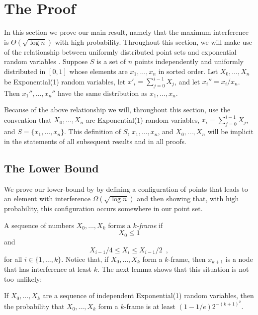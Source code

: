 \documentclass{patmorin}
\begin{document}
\section{The Proof}

In this section we prove our main result, namely that the maximum
interference is $\Theta(\sqrt{\log n})$ with high probability.
Throughout this section, we will make use of the relationship between
uniformly distributed point sets and exponential random variables
\cite[Chapter~V, Theorem~2.2]{d86}.  Suppose $S$ is a set of $n$ points
independently and uniformly distributed in $[0,1]$ whose elements are
$x_1,\ldots,x_n$ in sorted order.  Let $X_0,\ldots,X_n$ be Exponential(1)
random variables, let $x'_i=\sum_{j=0}^{i-1}X_j$, and let $x_i''=x_i/x_n$.
Then $x_1'',\ldots,x_n''$ have the same distribution as $x_1,\ldots,x_n$.

Because of the above relationship we will, throughout this section, use
the convention that $X_0,\ldots,X_n$ are Exponential(1) random variables,
$x_i=\sum_{j=0}^{i-1}X_j$, and $S=\{x_1,\ldots,x_n\}$.  This definition
of $S$, $x_1,\ldots,x_n$, and $X_0,\ldots,X_n$ will be implicit in the
statements of all subsequent results and in all proofs.

\subsection{The Lower Bound}

We prove our lower-bound by by defining a configuration of points that
leads to an element with interference $\Omega(\sqrt{\log n})$ and then
showing that, with high probability, this configuration occurs somewhere
in our point set.

A sequence of numbers $X_0,\ldots,X_k$ forms a \emph{$k$-frame} if
\[
     X_0 \le 1
\]
and
\[
     X_{i-1}/4 \le X_i \le X_{i-1}/2 \enspace ,
\]
for all $i\in\{1,\ldots,k\}$.  Notice that, if $X_0,\ldots,X_k$ form a
$k$-frame, then $x_{k+1}$ is a node that has interference at least $k$.
The next lemma shows that this situation is not too unlikely:

\begin{lem}
If $X_0,\ldots,X_k$ are a sequence of independent Exponential(1) random
variables, then the probability that $X_0,\ldots,X_k$ form a $k$-frame
is at least $(1-1/e)2^{-(k+1)^2}$.
\end{lem}
\end{document}
